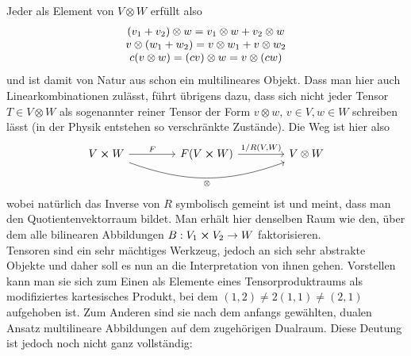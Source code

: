 \documentclass[../H_Analysis_main.tex]{subfiles}
\begin{document}
Jeder  als Element von $V \otimes W$ erfüllt also
\begin{equation*}
\mqty{(v_1 + v_2) \otimes w = v_1 \otimes w + v_2 \otimes w \\ v \otimes (w_1 + w_2) = v \otimes w_1 + v \otimes w_2 \\ c(v \otimes w) = (c v) \otimes w = v \otimes (c w)}
\end{equation*}
und ist damit von Natur aus schon ein multilineares Objekt. Dass man hier auch Linearkombinationen zulässt, führt übrigens dazu, dass sich nicht jeder Tensor $T \in V \otimes W$ als sogenannter reiner Tensor der Form $v \otimes w, \, v \in V, w \in W$ schreiben lässt (in der Physik entstehen so verschränkte Zustände). Die Weg ist hier also
$$
\begin{tikzcd}[column sep = 42]
V \cross W \arrow{r}{F} \arrow[swap, bend right = 20]{rr}{\otimes} & F(V \cross W) \arrow{r}{1/ R(V, W)} & V \otimes W%
\end{tikzcd}
$$
wobei natürlich das Inverse von $R$ symbolisch gemeint ist und meint, dass man den Quotientenvektorraum bildet. Man erhält hier denselben Raum wie den, über dem alle bilinearen Abbildungen $B: V_1 \cross V_2 \rightarrow W$ faktorisieren.\\


Tensoren sind ein sehr mächtiges Werkzeug, jedoch an sich sehr abstrakte Objekte und daher soll es nun an die Interpretation von ihnen gehen. Vorstellen kann man sie sich zum Einen als Elemente eines Tensorproduktraums als modifiziertes kartesisches Produkt, bei dem $(1, 2) \neq 2 (1, 1) \neq (2, 1)$ aufgehoben ist. Zum Anderen sind sie nach dem anfangs gewählten, dualen Ansatz multilineare Abbildungen auf dem zugehörigen Dualraum. Diese Deutung ist jedoch noch nicht ganz vollständig:
\end{document}

